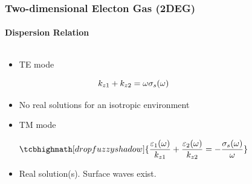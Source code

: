 \documentclass[mathserif,18pt,xcolor=table]{beamer}
\begin{document}
    \begin{frame}
      \frametitle{Two-dimensional Electon Gas (2DEG)}
      \framesubtitle{Dispersion Relation}
      \begin{columns} %
        \begin{column}[T]{.5\textwidth}
          \begin{itemize}
            \item TE mode
          \end{itemize}
          \begin{equation} \nonumber
            k_{z1} + k_{z2} = \omega \sigma_s(\omega)
            \label{eq:disp_TE_two}
          \end{equation}
          \begin{itemize}
            \item[] No real solutions for an isotropic environment
          \end{itemize}
          \begin{itemize}
            \item TM mode
          \end{itemize}
          \begin{equation} \nonumber
            \tcbhighmath[drop fuzzy shadow]{\frac{\E_1(\O)}{k_{z1}} + \frac{\E_2(\O)}{k_{z2}} = -\frac{\sigma_s(\O)}{\O}}
            \label{eq:disp_TM_two}
          \end{equation}
          \begin{itemize}
            \item[] Real solution(s). Surface waves exist.
          \end{itemize}
        \end{column}
        \begin{column}[T]{.5\textwidth}
          \begin{equation} \nonumber
            \begin{split}

\end{split}
\end{equation}
\end{column}
\end{columns}
\end{frame}
\end{document}
